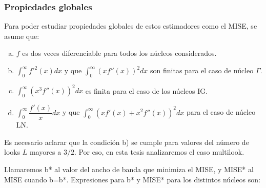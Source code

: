 \subsubsection{Propiedades globales}

Para poder estudiar propiedades globales de estos estimadores como el MISE, se asume que:

\begin{enumerate}[a)]
	\item $f$ es dos veces diferenciable para todos los núcleos considerados.
	\item $\displaystyle{\int_0^{\infty}}  f'^2(x) dx$ y que $\displaystyle{\int_0^{\infty}}  (x f''(x))^2 dx$ son finitas para el caso de núcleo $\Gamma$.
	\item $\displaystyle{\int_0^{\infty}}  (x^3 f''(x))^2 dx$ es finita para el caso de los núcleos IG.
	\item $\displaystyle{\int_0^{\infty}}  \dfrac{f'(x)}{x} dx$ y que $\displaystyle{\int_0^{\infty}}  (x f'(x)+x^2 f''(x))^2 dx$  para el caso de núcleo LN.
\end{enumerate}

Es necesario aclarar que la condición b) se cumple para valores del número de looks $L$ mayores a $3/2$. Por eso, en esta tesis analizaremos el caso multilook.

Llamaremos b* al valor del ancho de banda que minimiza el MISE, y MISE* al MISE cuando b=b*. Expresiones para b* y MISE* para los distintos núcleos son:

